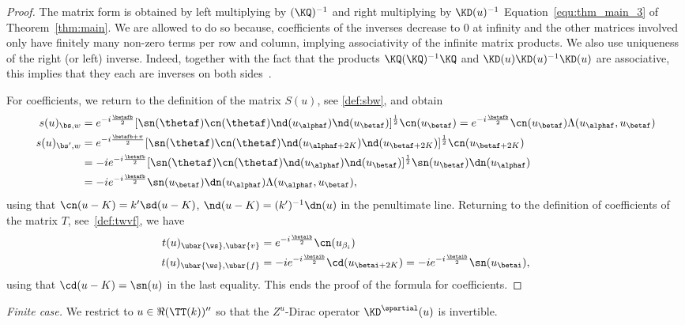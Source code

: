 \documentclass[a4paper,twoside,11pt]{article}
\begin{document}
\begin{proof}
The matrix form is obtained by left multiplying by $(\KQ)^{-1}$ and right multiplying by $\KD(u)^{-1}$ Equation~\eqref{equ:thm_main_3}
of Theorem~\ref{thm:main}. We are allowed to do so because, coefficients of the inverses decrease to 0 at infinity and the 
other matrices involved only have finitely many non-zero terms per row and column, implying associativity of the infinite 
matrix products. We also use uniqueness of the right (or left) inverse. Indeed, together with 
the fact that the products $\KQ (\KQ)^{-1}\KQ$ and $\KD(u)\KD(u)^{-1}\KD(u)$ are associative, this implies that they each are 
inverses on both sides~\cite{Cooke}.

For coefficients, we return to the definition of the matrix $S(u)$, see \eqref{def:sbw}, and obtain
\begin{align*}
s(u)_{\bs,w}&=e^{-i\frac{\betafb}{2}} 
[\sn(\thetaf)\cn(\thetaf)\nd(u_{\alphaf})\nd(u_{\betaf})]^{\frac{1}{2}}\cn(u_{\betaf})
=e^{-i\frac{\betafb}{2}}\cn(u_{\betaf})\Lambda(u_{\alphaf},u_{\betaf}) \\
s(u)_{\bs',w}&=
e^{-i\frac{\betafb+\pi}{2}}[\sn(\thetaf)\cn(\thetaf)\nd(u_{\alphaf+2K})\nd(u_{\betaf+2K})]^{\frac{1}{2}} \cn(u_{\betaf+2K})\\
&=-i e^{-i\frac{\betafb}{2}} [\sn(\thetaf)\cn(\thetaf)\nd(u_{\alphaf})\nd(u_{\betaf})]^{\frac{1}{2}} 
\sn(u_{\betaf})\dn(u_{\alphaf})\\
&=-i e^{-i\frac{\betafb}{2}} \sn(u_{\betaf})\dn(u_{\alphaf}) \Lambda(u_{\alphaf},u_{\betaf}),
\end{align*}
using that $\cn(u-K)=k'\sd(u-K)$, $\nd(u-K)=(k')^{-1}\dn(u)$ in the penultimate line.
Returning to the definition of coefficients of the matrix $T$, see~\eqref{def:twvf}, we have
\begin{align*}
t(u)_{\ubar{\ws},\ubar{v}}&= e^{-i\frac{\betaib}{2}}\cn(u_{\beta_i})\\
t(u)_{\ubar{\ws},\ubar{f}}&=-i e^{-i\frac{\betaib}{2}}\cd(u_{\betai+2K})=
-i e^{-i\frac{\betaib}{2}}\sn(u_{\betai}),
\end{align*}
using that $\cd(u-K)=\sn(u)$ in the last equality. This ends the proof of the formula for coefficients.
\end{proof}


\emph{Finite case.} We restrict to $u\in\Re(\TT(k))''$ so that the $Z^u$-Dirac operator $\KD^\spartial(u)$ is invertible.
\end{document}
